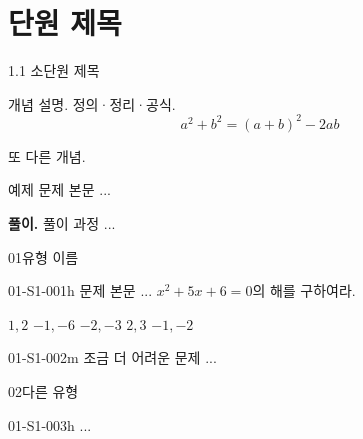 
\chapter{단원 제목}

\begin{conceptpage}{1.1 소단원 제목}

\begin{concept}[핵심 개념 1]
개념 설명. 정의·정리·공식.
\[
\boxed{a^2 + b^2 = (a+b)^2 - 2ab}
\]
\end{concept}

\begin{concept}[핵심 개념 2]
또 다른 개념.
\end{concept}

\begin{example}[예제 1]
예제 문제 본문 ...

\textbf{풀이.} 풀이 과정 ...
\end{example}


\end{conceptpage}

\clearpage

\begin{stepone}

\begin{type}{01}{유형 이름}

\begin{problem}{01-S1-001}{h}
문제 본문 ... $x^2 + 5x + 6 = 0$의 해를 구하여라.
\begin{choices}
  \choice $1, 2$
  \choice $-1, -6$
  \choice $-2, -3$
  \choice $2, 3$
  \choice $-1, -2$
\end{choices}
\end{problem}

\begin{problem}{01-S1-002}{m}
조금 더 어려운 문제 ...
\end{problem}

\end{type}

\begin{type}{02}{다른 유형}

\begin{problem}{01-S1-003}{h}
...
\end{problem}

\end{type}

\end{stepone}

